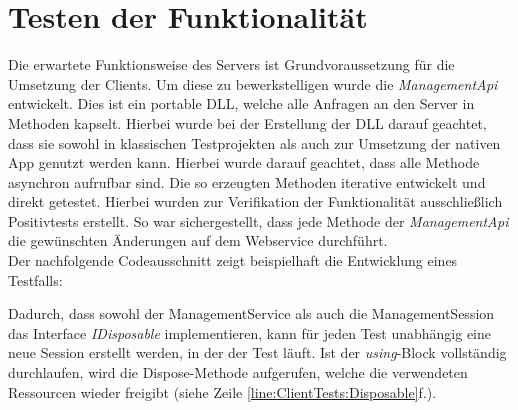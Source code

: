 \section{Testen der Funktionalität}
\label{sec:server-tests}
Die erwartete Funktionsweise des Servers ist Grundvoraussetzung für die Umsetzung der Clients. Um diese zu bewerkstelligen wurde die \textit{ManagementApi} entwickelt. Dies ist ein portable DLL, welche alle Anfragen an den Server in Methoden kapselt. Hierbei wurde bei der Erstellung der DLL darauf geachtet, dass sie sowohl in klassischen Testprojekten als auch zur Umsetzung der nativen App genutzt werden kann. Hierbei wurde darauf geachtet, dass alle Methode asynchron aufrufbar sind.
Die so erzeugten Methoden iterative entwickelt und direkt getestet. Hierbei wurden zur Verifikation der Funktionalität ausschließlich Positivtests erstellt. So war sichergestellt, dass jede Methode der \textit{ManagementApi} die gewünschten Änderungen auf dem Webservice durchführt. \\Der nachfolgende Codeausschnitt zeigt beispielhaft die Entwicklung eines Testfalls:

Dadurch, dass sowohl der ManagementService als auch die ManagementSession das Interface \textit{IDisposable} implementieren, kann für jeden Test unabhängig eine neue Session erstellt werden, in der der Test läuft. Ist der \textit{using}-Block vollständig durchlaufen, wird die Dispose-Methode aufgerufen, welche die verwendeten Ressourcen wieder freigibt (siehe Zeile \ref{line:ClientTests:Disposable}f.). 